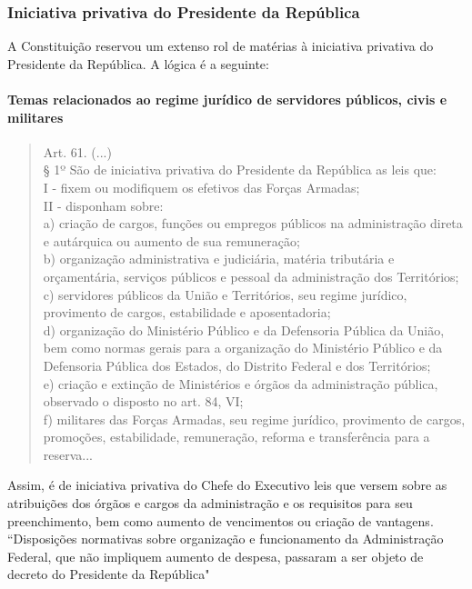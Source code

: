 \documentclass{article}
\begin{document}
\subsubsection{Iniciativa privativa do Presidente da República}

A Constituição reservou um extenso rol de matérias à iniciativa privativa do Presidente da República. A lógica é a seguinte:

\paragraph{Temas relacionados ao regime jurídico de servidores públicos, civis e militares}

\begin{quote}
    Art. 61. (...)\\
    § 1º São de iniciativa privativa do Presidente da República as leis que:\\
    I - fixem ou modifiquem os efetivos das Forças Armadas;\\
    II - disponham sobre:\\
    a) criação de cargos, funções ou empregos públicos na administração direta e autárquica ou aumento de sua remuneração;\\
    b) organização administrativa e judiciária, matéria tributária e orçamentária, serviços públicos e pessoal da administração dos Territórios;\\
    c) servidores públicos da União e Territórios, seu regime jurídico, provimento de cargos, estabilidade e aposentadoria;\\
    d) organização do Ministério Público e da Defensoria Pública da União, bem como normas gerais para a organização do Ministério Público e da Defensoria Pública dos Estados, do Distrito Federal e dos Territórios;\\
    e) criação e extinção de Ministérios e órgãos da administração pública, observado o disposto no art. 84, VI;\\
    f) militares das Forças Armadas, seu regime jurídico, provimento de cargos, promoções, estabilidade, remuneração, reforma e transferência para a reserva... \cite{brasil_constituicao_1988}
\end{quote}

Assim, é de iniciativa privativa do Chefe do Executivo leis que versem sobre as atribuições dos órgãos e cargos da administração e os requisitos para seu preenchimento, bem como aumento de vencimentos ou criação de vantagens. ``Disposições normativas sobre organização e funcionamento da Administração Federal, que não impliquem aumento de despesa, passaram a ser objeto de decreto do Presidente da República" \cite[p.~1057]{mendes_curso_2024}
\end{document}
